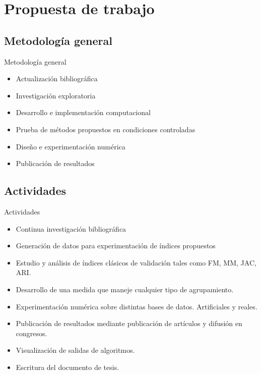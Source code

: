 \section{Propuesta de trabajo}

\subsection{Metodología general}
\begin{frame}[t]
	\begin{block}{Metodología general}
		\begin{itemize}
			\item<2-> Actualización bibliográfica
			\item<3-> Investigación exploratoria
			\item<4-> Desarrollo e implementación computacional
			\item<5-> Prueba de métodos propuestos en condiciones controladas
			\item<6-> Diseño e experimentación numérica
			\item<7-> Publicación de resultados
		\end{itemize}
	\end{block}
\end{frame}

\subsection{Actividades}
\begin{frame}[t]
	\begin{block}{Actividades}
		\begin{itemize}
			\item<2-> Continua investigación bibliográfica
			\item<3-> Generación de datos para experimentación de índices propuestos
			\item<4-> Estudio y análisis de índices clásicos de validación tales como FM, MM, JAC, ARI.
			\item<5-> Desarrollo de una medida que maneje cualquier tipo de agrupamiento.
			\item<6-> Experimentación numérica sobre distintas bases de datos. Artificiales y reales.
			\item<7-> Publicación de resultados mediante publicación de artículos y difusión en congresos.
			\item<8-> Visualización de salidas de algoritmos.
			\item<9-> Escritura del documento de tesis.
		\end{itemize}
	\end{block}
\end{frame}
